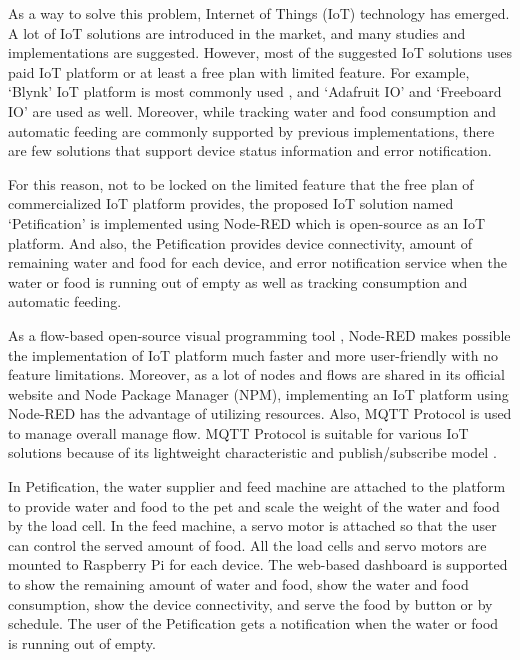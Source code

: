 \documentclass[conference]{IEEEtran}
\begin{document}
As a way to solve this problem, Internet of Things (IoT) technology has emerged. A lot of IoT solutions are introduced in the market, and many studies and implementations are suggested.
However, most of the suggested IoT solutions uses paid IoT platform or at least a free plan with limited feature. For example, ‘Blynk’ IoT platform is most commonly used \cite{b2, b3, b4, b5}, and ‘Adafruit IO’ \cite{b6} and ‘Freeboard IO’ \cite{b7} are used as well.
Moreover, while tracking water and food consumption and automatic feeding are commonly supported by previous implementations, there are few solutions that support device status information and error notification.

For this reason, not to be locked on the limited feature that the free plan of commercialized IoT platform provides, the proposed IoT solution named ‘Petification’ is implemented using Node-RED which is open-source as an IoT platform. And also, the Petification provides device connectivity, amount of remaining water and food for each device, and error notification service when the water or food is running out of empty as well as tracking consumption and automatic feeding.

As a flow-based open-source visual programming tool \cite{b8}, Node-RED makes possible the implementation of IoT platform much faster and more user-friendly with no feature limitations. Moreover, as a lot of nodes and flows are shared in its official website and Node Package Manager (NPM), implementing an IoT platform using Node-RED has the advantage of utilizing resources. Also, MQTT Protocol is used to manage overall manage flow. MQTT Protocol is suitable for various IoT solutions because of its lightweight characteristic and publish/subscribe model \cite{b9}.

In Petification, the water supplier and feed machine are attached to the platform to provide water and food to the pet and scale the weight of the water and food by the load cell. In the feed machine, a servo motor is attached so that the user can control the served amount of food. All the load cells and servo motors are mounted to Raspberry Pi for each device.
The web-based dashboard is supported to show the remaining amount of water and food, show the water and food consumption, show the device connectivity, and serve the food by button or by schedule. The user of the Petification gets a notification when the water or food is running out of empty.
\end{document}
